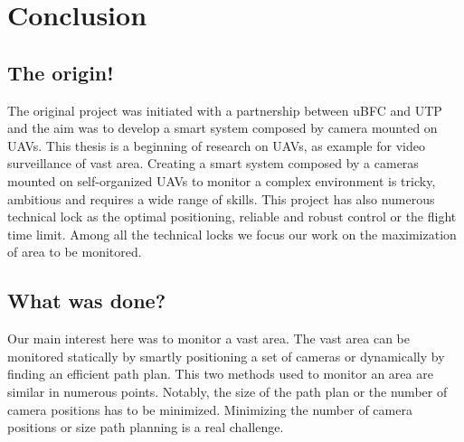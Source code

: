 \chapter{Conclusion}\label{chap:Conclu}

\minitoc



\section{The origin! }
The original project was initiated with a partnership between uBFC and UTP and the aim was to develop a smart system composed by camera mounted on UAVs. This thesis is a beginning of research on UAVs, as example for video surveillance of vast area. Creating a smart system composed by a cameras mounted on self-organized UAVs to monitor a complex environment is tricky, ambitious and requires a wide range of skills. This project has also numerous technical lock as the optimal positioning, reliable and robust control or the flight time limit. Among all the technical locks we focus our work on the maximization of area to be monitored. 

\section{What was done?}
Our main interest here was to monitor a vast area. 
The vast area can be monitored statically by smartly positioning a set of cameras or dynamically by finding an efficient path plan. This two methods used to monitor an area are similar in numerous points. 
Notably, the size of the path plan or the number of camera positions has to be minimized. Minimizing the number of camera positions or size path planning is a real challenge. 


%


